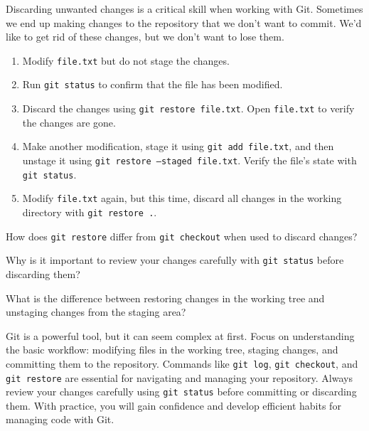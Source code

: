 \begin{challenge}
    \begin{task}
        Discarding unwanted changes is a critical skill when working with Git.
        Sometimes we end up making changes to the repository that we don't want to commit.
        We'd like to get rid of these changes, but we don't want to lose them.
        \begin{enumerate}
            \item Modify \texttt{file.txt} but do not stage the changes.
            \item Run \texttt{git status} to confirm that the file has been modified.
            \item Discard the changes using \texttt{git restore file.txt}. Open \texttt{file.txt} to verify the changes are gone.
            \item Make another modification, stage it using \texttt{git add file.txt}, and then unstage it using \texttt{git restore --staged file.txt}. Verify the file's state with \texttt{git status}.
            \item Modify \texttt{file.txt} again, but this time, discard all changes in the working directory with \texttt{git restore .}.
        \end{enumerate}

        \begin{questions}
            \item How does \texttt{git restore} differ from \texttt{git checkout} when used to discard changes?
            \item Why is it important to review your changes carefully with \texttt{git status} before discarding them?
            \item What is the difference between restoring changes in the working tree and unstaging changes from the staging area?
        \end{questions}
    \end{task}


    \begin{advice}
        Git is a powerful tool, but it can seem complex at first. 
        Focus on understanding the basic workflow: modifying files in the working tree, staging changes, and committing them to the repository. 
        Commands like \texttt{git log}, \texttt{git checkout}, and \texttt{git restore} are essential for navigating and managing your repository. 
        Always review your changes carefully using \texttt{git status} before committing or discarding them. 
        With practice, you will gain confidence and develop efficient habits for managing code with Git.
    \end{advice}
\end{challenge}

